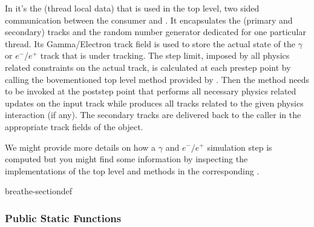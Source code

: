 \documentclass[letterpaper,10pt,english]{sphinxmanual}
\begin{document}
\begin{fulllineitems}
\sphinxAtStartPar
In  it’s the  (thread local data) that is used in the top level, two sided communication between the consumer and . It encapsulates the (primary and secondary) tracks and the random number generator dedicated for one particular thread. Its  Gamma/Electron track field is used to store the actual state of the \(\gamma\) or \(e^-/e^+\) track that is under tracking. The step limit, imposed by all physics related constraints on the actual track, is calculated at each pre\sphinxhyphen{}step point by calling the bove\sphinxhyphen{}mentioned  top level method provided by . Then the  method needs to be invoked at the post\sphinxhyphen{}step point that performs all necessary physics related updates on the input  track while produces all  tracks related to the given physics interaction (if any). The secondary tracks are delivered back to the caller in the appropriate  track fields of the  object.

\sphinxAtStartPar
We might provide more details on how a \(\gamma\) and \(e^-/e^+\) simulation step is computed but you might find some information by inspecting the implementations of the top level  and   methods in the corresponding . 

\begin{sphinxuseclass}{breathe-sectiondef}\subsubsection*{Public Static Functions}


\end{sphinxuseclass}
\end{fulllineitems}
\end{document}
